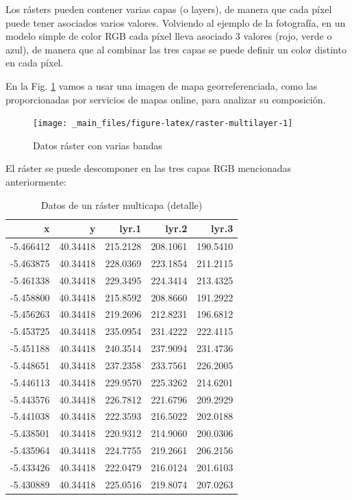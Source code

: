 \documentclass[
]{report}
\begin{document}
Los rásters pueden contener varias capas (o layers), de manera que cada píxel
puede tener asociados varios valores. Volviendo al ejemplo de la fotografía, en
un modelo simple de color RGB cada píxel lleva asociado 3 valores (rojo, verde o
azul), de manera que al combinar las tres capas se puede definir un color
distinto en cada píxel.

En la Fig. \ref{fig:raster-multilayer} vamos a usar una imagen de mapa
georreferenciada, como las proporcionadas por servicios de mapas online, para
analizar su composición.

\begin{figure}

{\centering \texttt{[image: \_main\_files/figure-latex/raster-multilayer-1]} 

}

\caption{Datos ráster con varias bandas}\label{fig:raster-multilayer}
\end{figure}

El ráster se puede descomponer en las tres capas RGB mencionadas anteriormente:

\begin{table}

\caption{\label{tab:detalle-pixel-multicapa}Datos de un ráster multicapa (detalle)}
\centering
\begin{tabular}[t]{r|r|r|r|r}
\hline
x & y & lyr.1 & lyr.2 & lyr.3\\
\hline
-5.466412 & 40.34418 & 215.2128 & 208.1061 & 190.5410\\
\hline
-5.463875 & 40.34418 & 228.0369 & 223.1854 & 211.2115\\
\hline
-5.461338 & 40.34418 & 229.3495 & 224.3414 & 213.4325\\
\hline
-5.458800 & 40.34418 & 215.8592 & 208.8660 & 191.2922\\
\hline
-5.456263 & 40.34418 & 219.2696 & 212.8231 & 196.6812\\
\hline
-5.453725 & 40.34418 & 235.0954 & 231.4222 & 222.4115\\
\hline
-5.451188 & 40.34418 & 240.3514 & 237.9094 & 231.4736\\
\hline
-5.448651 & 40.34418 & 237.2358 & 233.7561 & 226.2005\\
\hline
-5.446113 & 40.34418 & 229.9570 & 225.3262 & 214.6201\\
\hline
-5.443576 & 40.34418 & 226.7812 & 221.6796 & 209.2929\\
\hline
-5.441038 & 40.34418 & 222.3593 & 216.5022 & 202.0188\\
\hline
-5.438501 & 40.34418 & 220.9312 & 214.9060 & 200.0306\\
\hline
-5.435964 & 40.34418 & 224.7755 & 219.2661 & 206.2156\\
\hline
-5.433426 & 40.34418 & 222.0479 & 216.0124 & 201.6103\\
\hline
-5.430889 & 40.34418 & 225.0516 & 219.8074 & 207.0263\\
\hline
\end{tabular}
\end{table}
\end{document}
